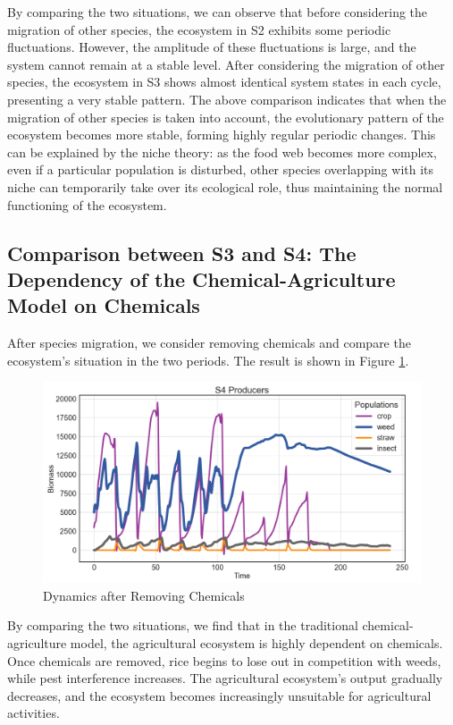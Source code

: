 \documentclass{HZNUMCM}
\begin{document}
        By comparing the two situations, we can observe that before considering the migration of other species, 
        the ecosystem in S2 exhibits some periodic fluctuations. However, the amplitude of these fluctuations is large, 
        and the system cannot remain at a stable level. After considering the migration of other species, 
        the ecosystem in S3 shows almost identical system states in each cycle, presenting a very stable pattern. 
        The above comparison indicates that when the migration of other species is taken into account, 
        the evolutionary pattern of the ecosystem becomes more stable, forming highly regular periodic changes. 
        This can be explained by the niche theory: as the food web becomes more complex, 
        even if a particular population is disturbed, 
        other species overlapping with its niche can temporarily take over its ecological role, 
        thus maintaining the normal functioning of the ecosystem.

      \subsection{Comparison between S3 and S4: The Dependency of the Chemical-Agriculture Model on Chemicals}
      After species migration, we consider removing chemicals and compare the ecosystem's situation in the two periods. 
      The result is shown in Figure \ref{fig:S4}.
      \begin{figure}
        \centering
        \includegraphics[width=0.8\linewidth]{images/P4_producers.png}
        \caption{Dynamics after Removing Chemicals}
        \label{fig:S4}
      \end{figure}
      
      By comparing the two situations, we find that in the traditional chemical-agriculture model, 
      the agricultural ecosystem is highly dependent on chemicals. Once chemicals are removed, 
      rice begins to lose out in competition with weeds, while pest interference increases. 
      The agricultural ecosystem's output gradually decreases, 
      and the ecosystem becomes increasingly unsuitable for agricultural activities.
      
\end{document}
